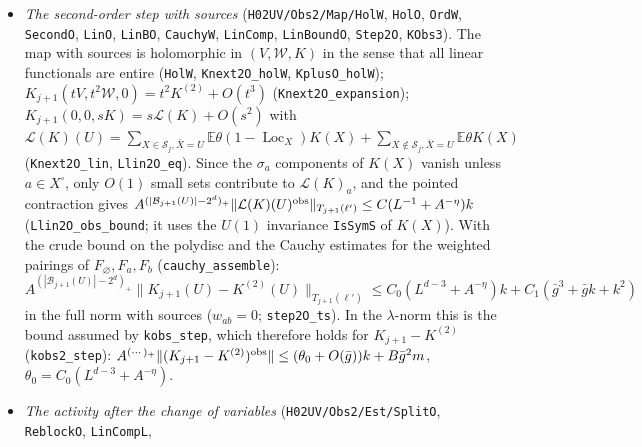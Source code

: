 \documentclass[11pt]{amsart}
\theoremstyle{definition}
\theoremstyle{remark}
\numberwithin{equation}{section}
\newcommand{\E}{\mathbb{E}}
\newcommand{\cS}{\mathcal{S}}
\newcommand{\Loc}{\operatorname{Loc}}
\begin{document}
\begin{itemize}
  $\|F\|=\|F_\varnothing\|+w_a\|F_a\|+w_b\|F_b\|$ ($w_{ab}=0$) is such a norm, also on the doubled algebra with two field
  scales (\texttt{oSN}). The block bounds hold in the full norm: the bulk parts are the bulk map, and the observable
  parts are bounded by the observable block bounds (\texttt{BHF}, \texttt{gdIO\_full}, \texttt{thetaKO\_full},
  \texttt{thetaJO\_full}, \texttt{prefO\_full}, \texttt{BHF.khyp}). Hence (\texttt{Knext2O\_crude\_ts}): if the bulk inputs
  satisfy the hypotheses of the bulk crude bound at radius $r_0$, all components are local, and the observable parts of
  $V(B)$, $\mathcal W(B)$ and $A^{(|\mathcal B_j(X)|-2^d)_+}K(X)$ have norm $\le r_0$, then
  $A^{(|\mathcal B_{j+1}(U)|-2^d)_+}\|K_{j+1}(U)\|_{T_{j+1}(\ell')}\le1$ in the full norm. This is the bound on the polydisc
  for the Cauchy estimates with sources.
\item \emph{The second-order step with sources} (\texttt{H02UV/Obs2/Map/HolW}, \texttt{HolO}, \texttt{OrdW}, \texttt{SecondO},
  \texttt{LinO}, \texttt{LinBO}, \texttt{CauchyW}, \texttt{LinComp}, \texttt{LinBoundO}, \texttt{Step2O}, \texttt{KObs3}). The map
  with sources is holomorphic in $(V,\mathcal W,K)$ in the sense that all linear functionals are entire (\texttt{HolW},
  \texttt{Knext2O\_holW}, \texttt{KplusO\_holW}); $K_{j+1}(tV,t^2\mathcal W,0)=t^2K^{(2)}+O(t^3)$ (\texttt{Knext2O\_expansion});
  $K_{j+1}(0,0,sK)=s\mathcal L(K)+O(s^2)$ with $\mathcal L(K)(U)=\sum_{X\in\cS_j,\bar X=U}\E\theta(1-\Loc_X)K(X)
  +\sum_{X\notin\cS_j,\bar X=U}\E\theta K(X)$ (\texttt{Knext2O\_lin}, \texttt{Llin2O\_eq}). Since the $\sigma_a$ components of $K(X)$
  vanish unless $a\in X^\square$, only $O(1)$ small sets contribute to $\mathcal L(K)_a$, and the pointed contraction gives
  $A^{(|\mathcal B_{j+1}(U)|-2^d)_+}\|\mathcal L(K)(U)^{\rm obs}\|_{T_{j+1}(\ell')}\le C(L^{-1}+A^{-\eta})k$ (\texttt{Llin2O\_obs\_bound};
  it uses the $U(1)$ invariance \texttt{IsSymS} of $K(X)$). With the crude bound on the polydisc and the Cauchy estimates for the
  weighted pairings of $F_\varnothing,F_a,F_b$ (\texttt{cauchy\_assemble}):
  \[A^{(|\mathcal B_{j+1}(U)|-2^d)_+}\|K_{j+1}(U)-K^{(2)}(U)\|_{T_{j+1}(\ell')}\le C_0(L^{d-3}+A^{-\eta})k+C_1(\bar g^3+\bar gk+k^2)\]
  in the full norm with sources ($w_{ab}=0$; \texttt{step2O\_ts}). In the $\lambda$-norm this is the bound assumed by
  \texttt{kobs\_step}, which therefore holds for $K_{j+1}-K^{(2)}$ (\texttt{kobs2\_step}):
  $A^{(\cdots)_+}\|(K_{j+1}-K^{(2)})^{\rm obs}\|\le(\theta_0+O(\bar g))k+B\bar g^2m$, $\theta_0=C_0(L^{d-3}+A^{-\eta})$.
\item \emph{The activity after the change of variables} (\texttt{H02UV/Obs2/Est/SplitO}, \texttt{ReblockO}, \texttt{LinCompL},

\end{itemize}
\end{document}
